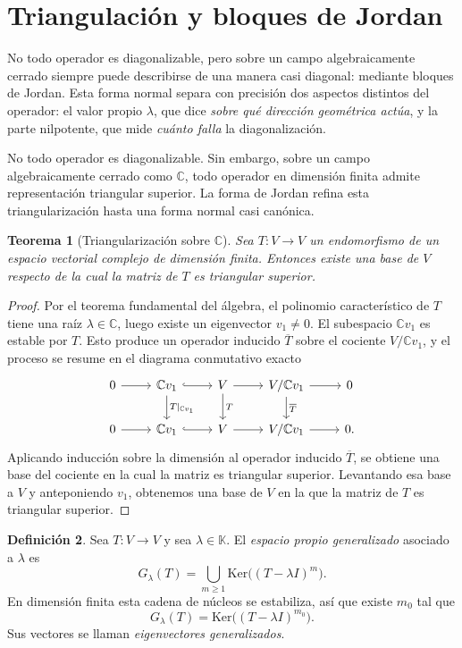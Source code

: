 \documentclass[10pt,a4paper,oneside]{article}
\theoremstyle{plain}
\newtheorem{theorem}{Teorema}[section]
\theoremstyle{definition}
\newtheorem{definition}[theorem]{Definición}
\theoremstyle{remark}
\newcommand{\K}{\mathbb{K}}
\newcommand{\C}{\mathbb{C}}
\newcommand{\Ker}{\mathrm{Ker}}
\begin{document}
\section{Triangulación y bloques de Jordan}
\begin{summaryBox}
No todo operador es diagonalizable, pero sobre un campo algebraicamente cerrado siempre puede describirse de una manera casi diagonal: mediante bloques de Jordan. Esta forma normal separa con precisión dos aspectos distintos del operador: el valor propio \(\lambda\), que dice \emph{sobre qué dirección geométrica actúa}, y la parte nilpotente, que mide \emph{cuánto falla} la diagonalización.
\end{summaryBox}

No todo operador es diagonalizable. Sin embargo, sobre un campo algebraicamente cerrado como \(\C\), todo operador en dimensión finita admite representación triangular superior. La forma de Jordan refina esta triangularización hasta una forma normal casi canónica.

\begin{theorem}[Triangularización sobre \(\C\)]
Sea \(T:V\to V\) un endomorfismo de un espacio vectorial complejo de dimensión finita. Entonces existe una base de \(V\) respecto de la cual la matriz de \(T\) es triangular superior.
\end{theorem}

\begin{proof}
Por el teorema fundamental del álgebra, el polinomio característico de \(T\) tiene una raíz \(\lambda\in\C\), luego existe un eigenvector \(v_1\neq 0\). El subespacio \(\C v_1\) es estable por \(T\). Esto produce un operador inducido \(\overline T\) sobre el cociente \(V/\C v_1\), y el proceso se resume en el diagrama conmutativo exacto
\[
\begin{tikzcd}
0 \arrow[r] & \C v_1 \arrow[r,hook] \arrow[d,"T|_{\C v_1}"] & V \arrow[r] \arrow[d,"T"] & V/\C v_1 \arrow[r] \arrow[d,"\overline T"] & 0 \\
0 \arrow[r] & \C v_1 \arrow[r,hook] & V \arrow[r] & V/\C v_1 \arrow[r] & 0.
\end{tikzcd}
\]
Aplicando inducción sobre la dimensión al operador inducido \(\overline T\), se obtiene una base del cociente en la cual la matriz es triangular superior. Levantando esa base a \(V\) y anteponiendo \(v_1\), obtenemos una base de \(V\) en la que la matriz de \(T\) es triangular superior.
\end{proof}

\begin{definition}
Sea \(T:V\to V\) y sea \(\lambda\in\K\). El \emph{espacio propio generalizado} asociado a \(\lambda\) es
\[
G_\lambda(T)=\bigcup_{m\ge 1}\Ker\bigl((T-\lambda I)^m\bigr).
\]
En dimensión finita esta cadena de núcleos se estabiliza, así que existe \(m_0\) tal que
\[
G_\lambda(T)=\Ker\bigl((T-\lambda I)^{m_0}\bigr).
\]
Sus vectores se llaman \emph{eigenvectores generalizados}.
\end{definition}
\end{document}
